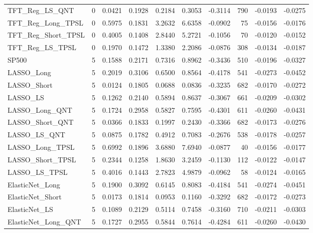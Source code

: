 \begin{tabular}{llrrrrrrrr}
\cline{1-10}
TFT\_Reg\_LS\_QNT & 0 & 0.0421 & 0.1928 & 0.2184 & 0.3053 & -0.3114 & 790 & -0.0193 & -0.0275 \\
\cline{1-10}
TFT\_Reg\_Long\_TPSL & 0 & 0.5975 & 0.1831 & 3.2632 & 6.6358 & -0.0902 & 75 & -0.0156 & -0.0176 \\
\cline{1-10}
TFT\_Reg\_Short\_TPSL & 0 & 0.4005 & 0.1408 & 2.8440 & 5.2721 & -0.1056 & 70 & -0.0120 & -0.0152 \\
\cline{1-10}
TFT\_Reg\_LS\_TPSL & 0 & 0.1970 & 0.1472 & 1.3380 & 2.2086 & -0.0876 & 308 & -0.0134 & -0.0187 \\
\cline{1-10}
SP500 & 5 & 0.1588 & 0.2171 & 0.7316 & 0.8962 & -0.3436 & 510 & -0.0196 & -0.0327 \\
\cline{1-10}
LASSO\_Long & 5 & 0.2019 & 0.3106 & 0.6500 & 0.8564 & -0.4178 & 541 & -0.0273 & -0.0452 \\
\cline{1-10}
LASSO\_Short & 5 & 0.0124 & 0.1805 & 0.0688 & 0.0836 & -0.3235 & 682 & -0.0170 & -0.0272 \\
\cline{1-10}
LASSO\_LS & 5 & 0.1262 & 0.2140 & 0.5894 & 0.8637 & -0.3067 & 661 & -0.0209 & -0.0302 \\
\cline{1-10}
LASSO\_Long\_QNT & 5 & 0.1724 & 0.2958 & 0.5827 & 0.7595 & -0.4301 & 611 & -0.0260 & -0.0431 \\
\cline{1-10}
LASSO\_Short\_QNT & 5 & 0.0366 & 0.1833 & 0.1997 & 0.2430 & -0.3366 & 682 & -0.0173 & -0.0276 \\
\cline{1-10}
LASSO\_LS\_QNT & 5 & 0.0875 & 0.1782 & 0.4912 & 0.7083 & -0.2676 & 538 & -0.0178 & -0.0257 \\
\cline{1-10}
LASSO\_Long\_TPSL & 5 & 0.6992 & 0.1896 & 3.6880 & 7.6940 & -0.0877 & 40 & -0.0156 & -0.0177 \\
\cline{1-10}
LASSO\_Short\_TPSL & 5 & 0.2344 & 0.1258 & 1.8630 & 3.2459 & -0.1130 & 112 & -0.0122 & -0.0147 \\
\cline{1-10}
LASSO\_LS\_TPSL & 5 & 0.4016 & 0.1443 & 2.7823 & 4.9879 & -0.0962 & 58 & -0.0124 & -0.0165 \\
\cline{1-10}
ElasticNet\_Long & 5 & 0.1900 & 0.3092 & 0.6145 & 0.8083 & -0.4184 & 541 & -0.0274 & -0.0451 \\
\cline{1-10}
ElasticNet\_Short & 5 & 0.0173 & 0.1814 & 0.0953 & 0.1160 & -0.3292 & 682 & -0.0172 & -0.0273 \\
\cline{1-10}
ElasticNet\_LS & 5 & 0.1089 & 0.2129 & 0.5114 & 0.7458 & -0.3160 & 710 & -0.0211 & -0.0303 \\
\cline{1-10}
ElasticNet\_Long\_QNT & 5 & 0.1727 & 0.2955 & 0.5844 & 0.7614 & -0.4284 & 611 & -0.0260 & -0.0430 \\

\end{tabular}
